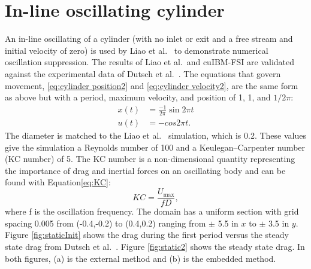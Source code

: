 \section{In-line oscillating cylinder}
\label{sec:Oscillating Cylinder in no Flow}
An in-line oscillating of a cylinder (with no inlet or exit and a free stream and initial velocity of zero) is used by Liao et al.~\cite{liao2010simulating} to demonstrate numerical oscillation suppression. 
The results of Liao et al.~and cuIBM-FSI are validated against the experimental data of Dutsch et al.~\cite{dutsch1998low}. 
The equations that govern movement, \eqref{eq:cylinder position2} and \eqref{eq:cylinder velocity2}, are the same form as above but with a period, maximum velocity, and position of 1, 1, and $1/2\pi$:
\begin{align}
x(t)&=\frac{-1}{2\pi}\sin{2\pi t}\label{eq:cylinder position2}\\
u(t)&=-cos{2\pi t}.\;\label{eq:cylinder velocity2}
\end{align}
The diameter is matched to the Liao et al.~\cite{liao2010simulating} simulation, which is 0.2. 
These values give the simulation a Reynolds number of 100 and a Keulegan–Carpenter number (KC number) of 5. 
The KC number is a non-dimensional quantity representing the importance of drag and inertial forces on an oscillating body and can be found with Equation\eqref{eq:KC}:
\begin{equation}
KC = \frac{U_\text{max}}{fD} \label{eq:KC},
\end{equation}
where f is the oscillation frequency. 
The domain has a uniform section with grid spacing 0.005 from (-0.4,-0.2) to (0.4,0.2) ranging from $\pm$ 5.5 in $x$ to $\pm$ 3.5 in $y$. 
Figure \ref{fig:staticInit} shows the drag during the first period versus the steady state drag from Dutsch et al.~\cite{dutsch1998low}. 
Figure \ref{fig:static2} shows the steady state drag. 
In both figures, (a) is the external method and (b) is the embedded method.
